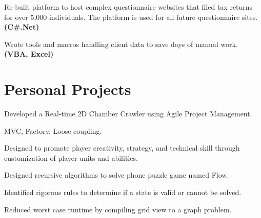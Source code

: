 \documentclass[letterpaper]{kevin-resume} %
\begin{document}
\begin{minipage}[t]{0.66\textwidth}
\sectionspace %


\begin{tightitemize}
	\item Re-built platform to host complex questionnaire websites that filed tax returns for over 5,000 individuals. The platform is used for all future questionnaire sites. \textbf{(C\#.Net)}
	\item Wrote tools and macros handling client data to save days of manual work. \textbf{(VBA, Excel)}
\end{tightitemize}

\sectionspace %


\section{Personal Projects}

\begin{tightitemize}
	\item Developed a Real-time 2D Chamber Crawler using Agile Project Management.
	\item MVC, Factory, Loose coupling.
	\item Designed to promote player creativity, strategy, and technical skill through customization of player units and abilities.
\end{tightitemize}

\sectionspace %


\begin{tightitemize}
	\item Designed recursive algorithms to solve phone puzzle game named Flow.
 	\item Identified rigorous rules to determine if a state is valid or cannot be solved.
 	\item Reduced worst case runtime by compiling grid view to a graph problem. 
\end{tightitemize}


\end{minipage}
\end{document}
